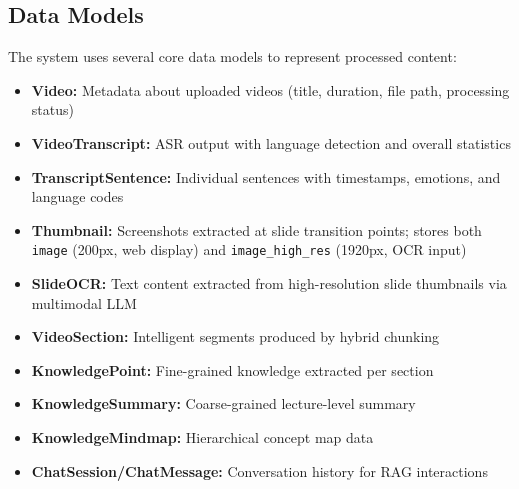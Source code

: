 \subsection{Data Models}

The system uses several core data models to represent processed content:

\begin{itemize}
    \item \textbf{Video:} Metadata about uploaded videos (title, duration, file path, processing status)
    \item \textbf{VideoTranscript:} ASR output with language detection and overall statistics
    \item \textbf{TranscriptSentence:} Individual sentences with timestamps, emotions, and language codes
    \item \textbf{Thumbnail:} Screenshots extracted at slide transition points; stores both \texttt{image} (200px, web display) and \texttt{image\_high\_res} (1920px, OCR input)
    \item \textbf{SlideOCR:} Text content extracted from high-resolution slide thumbnails via multimodal LLM
    \item \textbf{VideoSection:} Intelligent segments produced by hybrid chunking
    \item \textbf{KnowledgePoint:} Fine-grained knowledge extracted per section
    \item \textbf{KnowledgeSummary:} Coarse-grained lecture-level summary
    \item \textbf{KnowledgeMindmap:} Hierarchical concept map data
    \item \textbf{ChatSession/ChatMessage:} Conversation history for RAG interactions
\end{itemize}
